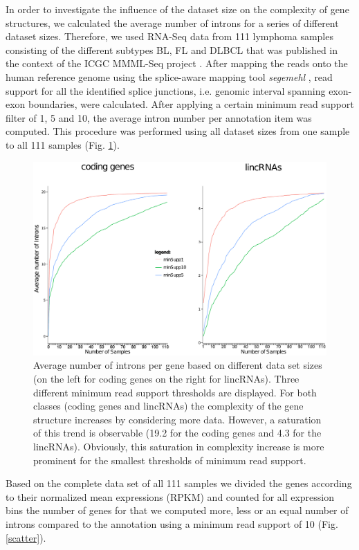 \documentclass[ncrna,article,submit,moreauthors,pdftex,10pt,a4paper]{mdpi}
\begin{document}
In order to investigate the influence of the dataset size on the complexity of gene structures, we calculated the average number of introns for a series of different dataset sizes.
Therefore, we used RNA-Seq data from 111 lymphoma samples  consisting of the different subtypes BL, FL and DLBCL that was published in the context of the ICGC MMML-Seq project \citep{Richter2012-un}.
After mapping the reads onto the human reference genome using the splice-aware mapping tool \textit{segemehl} \citep{hoffmann2009, hoffmann2014}, read support for all the identified splice junctions, i.e. genomic interval spanning exon-exon boundaries, were calculated. After applying a certain minimum read support filter of 1, 5 and 10, the average intron number per annotation item was computed. This procedure was performed using all dataset sizes from one sample to all 111 samples (Fig. \ref{saturation}).

\begin{figure}[H]
 \centering
 \includegraphics[width=\linewidth]{saturation}
 \caption{
Average number of introns per gene based on different data set sizes (on the left for coding genes on the right for lincRNAs). Three different minimum read support thresholds are displayed.
For both classes (coding genes and lincRNAs) the complexity of the gene structure increases by considering more data. However, a saturation of this trend is observable (19.2 for the coding genes and 4.3 for the lincRNAs). Obviously, this saturation in complexity increase is more prominent for the smallest thresholds of minimum read support.}
 \label{saturation}
\end{figure}

Based on the complete data set of all 111 samples we divided the genes according to their normalized mean expressions (RPKM) and counted for all expression bins the number of genes for that we computed more, less or an equal number of introns compared to the annotation using a minimum read support of 10 (Fig. \ref{scatter}). 
\end{document}
